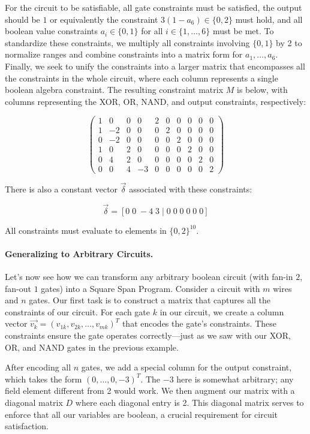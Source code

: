 For the circuit to be satisfiable, all gate constraints must be satisfied, the output should be $1$ or equivalently the constraint $3(1 - a_6) \in \{0, 2\}$ must hold, and all boolean value constraints $a_i \in \{0, 1\}$ for all $i \in \{1,\ldots,6\}$ must be met. To standardize these constraints, we multiply all constraints involving $\{0, 1\}$ by 2 to normalize ranges and combine constraints into a matrix form for $a_1,\ldots,a_6$. Finally, we seek to unify the constraints into a larger matrix that encompasses all the constraints in the whole circuit, where each column represents a single boolean algebra constraint. The resulting constraint matrix $M$ is below, with columns representing the XOR, OR, NAND, and output constraints, respectively:

\[ \begin{pmatrix}
1 & 0 & 0 & 0 & 2 & 0 & 0 & 0 & 0 & 0 \\
1 & -2 & 0 & 0 & 0 & 2 & 0 & 0 & 0 & 0 \\
0 & -2 & 0 & 0 & 0 & 0 & 2 & 0 & 0 & 0 \\
1 & 0 & 2 & 0 & 0 & 0 & 0 & 2 & 0 & 0 \\
0 & 4 & 2 & 0 & 0 & 0 & 0 & 0 & 2 & 0 \\
0 & 0 & 4 & -3 & 0 & 0 & 0 & 0 & 0 & 2
\end{pmatrix} \]

There is also a constant vector $\vec{\delta}$ associated with these constraints:

\[ \vec{\delta} = [0 \; 0 \; -4 \; 3 \; | \; 0 \; 0 \; 0 \; 0 \; 0 \; 0] \]

All constraints must evaluate to elements in $\{0, 2\}^{10}$. 

\paragraph{Generalizing to Arbitrary Circuits.}

Let's now see how we can transform any arbitrary boolean circuit (with fan-in $2$, fan-out $1$ gates) into a Square Span Program. Consider a circuit with $m$ wires and $n$ gates. Our first task is to construct a matrix that captures all the constraints of our circuit. For each gate $k$ in our circuit, we create a column vector $\vec{v_k} = (v_{1k}, v_{2k}, \ldots, v_{mk})^T$ that encodes the gate's constraints. These constraints ensure the gate operates correctly—just as we saw with our XOR, OR, and NAND gates in the previous example.

After encoding all $n$ gates, we add a special column for the output constraint, which takes the form $(0,\ldots,0,-3)^T$. The $-3$ here is somewhat arbitrary; any field element different from 2 would work. We then augment our matrix with a diagonal matrix $D$ where each diagonal entry is 2. This diagonal matrix serves to enforce that all our variables are boolean, a crucial requirement for circuit satisfaction.

